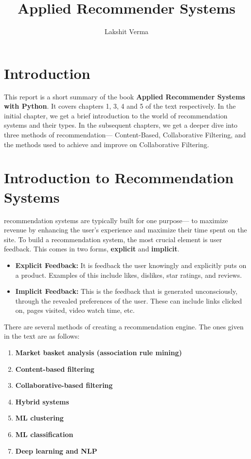 \documentclass{article}
\title{Applied Recommender Systems}
\author{Lakshit Verma}
\begin{document}
\maketitle
\tableofcontents
\newpage

\section{Introduction}

This report is a short summary of the book \textbf{Applied Recommender Systems with Python}. It covers chapters 1, 3, 4 and 5 of the text respectively. In the initial chapter, we get a brief introduction to the world of recommendation systems and their types. In the subsequent chapters, we get a deeper dive into three methods of recommendation— Content-Based, Collaborative Filtering, and the methods used to achieve and improve on Collaborative Filtering.

\section{Introduction to Recommendation Systems}

recommendation systems are typically built for one purpose— to maximize revenue by enhancing the user's experience and maximize their time spent on the site.
To build a recommendation system, the most crucial element is user feedback. This comes in two forms, \textbf{explicit} and \textbf{implicit}.

\begin{itemize}

    \item{\textbf{Explicit Feedback:} It is feedback the user knowingly and explicitly puts on a product. Examples of this include likes, dislikes, star ratings, and reviews.}
    \item{\textbf{Implicit Feedback:} This is the feedback that is generated unconsciously, through the revealed preferences of the user. These can include links clicked on, pages visited, video watch time, etc.}

\end{itemize}

There are several methods of creating a recommendation engine. The ones given in the text are as follows:

\begin{enumerate}
	\item{\textbf{Market basket analysis (association rule mining)}}
	\item{\textbf{Content-based filtering}}
	\item{\textbf{Collaborative-based filtering}}
	\item{\textbf{Hybrid systems}}
	\item{\textbf{ML clustering}}
	\item{\textbf{ML classification}}
	\item{\textbf{Deep learning and NLP}}
\end{enumerate}
\end{document}
